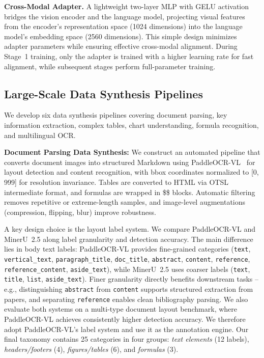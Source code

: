 \documentclass[dvipsnames]{article}
\begin{document}
\textbf{Cross-Modal Adapter.}
A lightweight two-layer MLP with GELU activation bridges the vision encoder and the language model, projecting visual features from the encoder's representation space (1024 dimensions) into the language model's embedding space (2560 dimensions). This simple design minimizes adapter parameters while ensuring effective cross-modal alignment. During Stage~1 training, only the adapter is trained with a higher learning rate for fast alignment, while subsequent stages perform full-parameter training.

\subsection{Large-Scale Data Synthesis Pipelines}

We develop six data synthesis pipelines covering document parsing, key information extraction, complex tables, chart understanding, formula recognition, and multilingual OCR.

\textbf{Document Parsing Data Synthesis:}
We construct an automated pipeline that converts document images into structured Markdown using PaddleOCR-VL~\citep{cui2025paddleocrvl} for layout detection and content recognition, with bbox coordinates normalized to [0, 999] for resolution invariance. Tables are converted to HTML via OTSL intermediate format, and formulas are wrapped in \$\$ blocks. Automatic filtering removes repetitive or extreme-length samples, and image-level augmentations (compression, flipping, blur) improve robustness.

A key design choice is the layout label system. We compare PaddleOCR-VL and MinerU~2.5 along label granularity and detection accuracy. The main difference lies in body text labels: PaddleOCR-VL provides fine-grained categories (\texttt{text}, \texttt{vertical\_text}, \texttt{paragraph\_title}, \texttt{doc\_title}, \texttt{abstract}, \texttt{content}, \texttt{reference}, \texttt{reference\_content}, \texttt{aside\_text}), while MinerU~2.5 uses coarser labels (\texttt{text}, \texttt{title}, \texttt{list}, \texttt{aside\_text}). Finer granularity directly benefits downstream tasks -- e.g., distinguishing \texttt{abstract} from \texttt{content} supports structured extraction from papers, and separating \texttt{reference} enables clean bibliography parsing. We also evaluate both systems on a multi-type document layout benchmark, where PaddleOCR-VL achieves consistently higher detection accuracy. We therefore adopt PaddleOCR-VL's label system and use it as the annotation engine. Our final taxonomy contains 25 categories in four groups: \textit{text elements} (12 labels), \textit{headers/footers} (4), \textit{figures/tables} (6), and \textit{formulas} (3).
\end{document}
